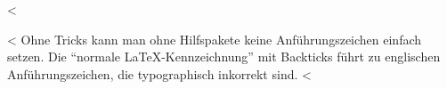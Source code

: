 <%

<%
Ohne \glqq{}Tricks\grqq{} kann man ohne Hilfspakete keine Anführungszeichen einfach setzen.
Die ``normale \LaTeX-Kennzeichnung'' mit Backticks führt zu englischen Anführungszeichen, die typographisch inkorrekt sind.
<%
